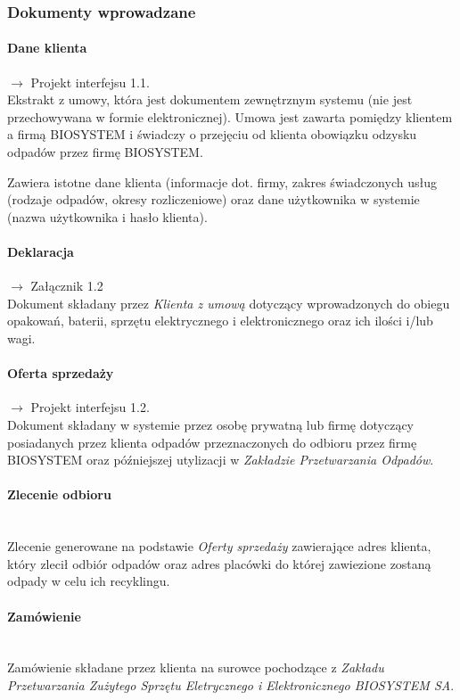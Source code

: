 
\subsubsection{Dokumenty wprowadzane}

	\paragraph{Dane klienta} $\rightarrow$ Projekt interfejsu 1.1. \\
	Ekstrakt z umowy, która jest dokumentem zewnętrznym systemu (nie jest przechowywana w formie elektronicznej).
	Umowa jest zawarta pomiędzy klientem a firmą BIOSYSTEM i świadczy o przejęciu od klienta obowiązku odzysku odpadów przez firmę BIOSYSTEM.

	Zawiera istotne dane klienta (informacje dot. firmy, zakres świadczonych usług (rodzaje odpadów, okresy rozliczeniowe) oraz dane użytkownika w systemie (nazwa użytkownika i hasło klienta).

	\paragraph{Deklaracja} $\rightarrow$ Załącznik 1.2 \\
	Dokument składany przez \emph{Klienta z umową} dotyczący wprowadzonych do obiegu opakowań, baterii, sprzętu elektrycznego i elektronicznego oraz ich ilości i/lub wagi.

	\paragraph{Oferta sprzedaży} $\rightarrow$ Projekt interfejsu 1.2.\ \\
	Dokument składany w systemie przez osobę prywatną lub firmę dotyczący posiadanych przez klienta odpadów przeznaczonych do odbioru przez firmę BIOSYSTEM oraz późniejszej utylizacji w \emph{Zakładzie Przetwarzania Odpadów}.

	\paragraph{Zlecenie odbioru} \ \\
	Zlecenie generowane na podstawie \emph{Oferty sprzedaży} zawierające adres klienta, który zlecił odbiór odpadów oraz adres placówki do której zawiezione zostaną odpady w celu ich recyklingu.

	\paragraph{Zamówienie} \ \\
	Zamówienie składane przez klienta na surowce pochodzące z \emph{Zakładu Przetwarzania Zużytego Sprzętu Eletrycznego i Elektronicznego BIOSYSTEM SA}.

